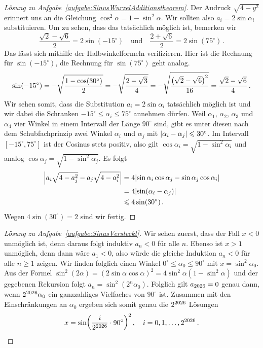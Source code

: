 \begin{proof}[Lösung zu Aufgabe~\ref{aufgabe:SinusWurzelAdditionstheorem}]
	Der Audruck $\sqrt{4-y^2}$ erinnert uns an die Gleichung $\cos^2\alpha=1-\sin^2\alpha$. Wir sollten also $a_i=2\sin\alpha_i$ substituieren. Um zu sehen, dass das tatsächlich möglich ist, bemerken wir
	\begin{equation*}
		\frac{\sqrt{2}-\sqrt{6}}{2}=2\sin(-15^\circ)\quad\text{und}\quad \frac{2+\sqrt{6}}{2}=2\sin(75^\circ)\,.
	\end{equation*}
	Das lässt sich mithilfe der Halbwinkelformeln verifizieren. Hier ist die Rechnung für $\sin(-15^\circ)$, die Rechnung für $\sin(75^\circ)$ geht analog.
	\begin{equation*}
		\sin(-15^\circ)=-\sqrt{\frac{1-\cos(30^\circ)}{2}}=-\sqrt{\frac{2-\sqrt{3}}{4}}=-\sqrt{\frac{\parens*{\sqrt{2}-\sqrt{6}}^2}{16}}=\frac{\sqrt{2}-\sqrt{6}}{4}\,.
	\end{equation*}
	Wir sehen somit, dass die Substitution $a_i=2\sin\alpha_i$ tatsächlich möglich ist und wir dabei die Schranken $-15^\circ\leqslant \alpha_i\leqslant 75^\circ$ annehmen dürfen. Weil $\alpha_1$, $\alpha_2$, $\alpha_3$ und $\alpha_4$ vier Winkel in einem Intervall der Länge $90^\circ$ sind, gibt es unter diesen nach dem Schubfachprinzip zwei Winkel $\alpha_i$ und $\alpha_j$ mit $\abs{\alpha_i-\alpha_j}\leqslant 30^\circ$. Im Intervall $[-15^\circ,75^\circ]$ ist der Cosinus stets positiv, also gilt $\cos \alpha_i=\sqrt{1-\sin^2\alpha_i}$ und analog $\cos \alpha_j=\sqrt{1-\sin^2\alpha_j}$. Es folgt
	\begin{align*}
		\abs*{a_i\sqrt{4-a_j^2}-a_j\sqrt{4-a_i^2}}&=4\abs*{\sin\alpha_i\cos\alpha_j-\sin\alpha_j\cos\alpha_i}\\
		&=4\abs*{\sin(\alpha_i-\alpha_j)}\\
		&\leqslant 4\sin(30^\circ)\,.
	\end{align*}
	Wegen $4\sin(30^\circ)=2$ sind wir fertig.
\end{proof}

\begin{proof}[Lösung zu Aufgabe~\ref{aufgabe:SinusVersteckt}]
	Wir sehen zuerst, dass der Fall $x<0$ unmöglich ist, denn daraus folgt induktiv $a_n<0$ für alle $n$. Ebenso ist $x>1$ unmöglich, denn dann wäre $a_1<0$, also würde die gleiche Induktion $a_n<0$ für alle $n\geqslant 1$ zeigen. Wir finden folglich einen Winkel $0^\circ\leqslant \alpha_0\leqslant 90^\circ$ mit $x=\sin^2\alpha_0$. Aus der Formel $\sin^2(2\alpha)=(2\sin\alpha\cos\alpha)^2=4\sin^2\alpha(1-\sin^2\alpha)$ und der gegebenen Rekursion folgt $a_n=\sin^2(2^n\alpha_0)$. Folglich gilt $a_{\the\year}=0$ genau dann, wenn $2^{\the\year}\alpha_0$ ein ganzzahliges Vielfaches von $90^\circ$ ist. Zusammen mit den Einschränkungen an $\alpha_0$ ergeben sich somit genau die $2^{\the\year}$ Lösungen
	\begin{equation*}
		x=\sin\parens*{\frac{i}{2^{\the\year}}\cdot 90^\circ}^2\,,\quad i=0,1,\dotsc,2^{\the\year}\,.\qedhere
	\end{equation*}
\end{proof}

